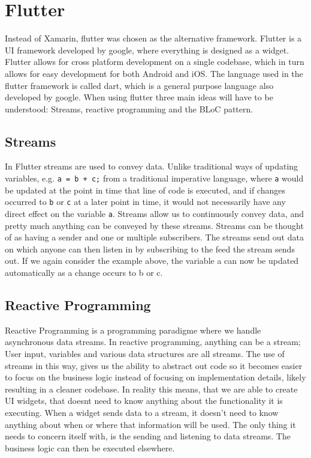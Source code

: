 \section{Flutter}
Instead of Xamarin, flutter was chosen as the alternative framework.
Flutter is a UI framework developed by google, where everything is designed as a widget.
Flutter allows for cross platform development on a single codebase, which in turn allows for easy development for both Android and iOS.
The language used in the flutter framework is called dart, which is a general purpose language also developed by google.
When using flutter three main ideas will have to be understood:
Streams, reactive programming and the BLoC pattern.

\subsection{Streams}
In Flutter streams are used to convey data.
Unlike traditional ways of updating variables, e.g. \lstinline{a = b + c;} from a traditional imperative language, where \lstinline{a} would be updated at the point in time that line of code is executed, and if changes occurred to \lstinline{b} or \lstinline{c} at a later point in time, it would not necessarily have any direct effect on the variable \lstinline{a}.
Streams allow us to continuously convey data, and pretty much anything can be conveyed by these streams.
Streams can be thought of as having a sender and one or multiple subscribers.
The streams send out data on which anyone can then listen in by subscribing to the feed the stream sends out.
If we again consider the example above, the variable a can now be updated automatically as a change occurs to b or c.
\subsection{Reactive Programming}
Reactive Programming is a programming paradigme where we handle asynchronous data streams. 
In reactive programming, anything can be a stream; User input, variables and various data structures are all streams. The use of streams in this way, gives us the ability to abstract out code so it becomes easier to focus on the business logic instead of focusing on implementation details, likely resulting in a cleaner codebase.
In reality this means, that we are able to create UI widgets, that doesnt need to know anything about the functionality it is executing. 
When a widget sends data to a stream, it doesn't need to know anything about when or where that information will be used. The only thing it needs to concern itself with, is the sending and listening to data streams. The business logic can then be executed elsewhere. 

